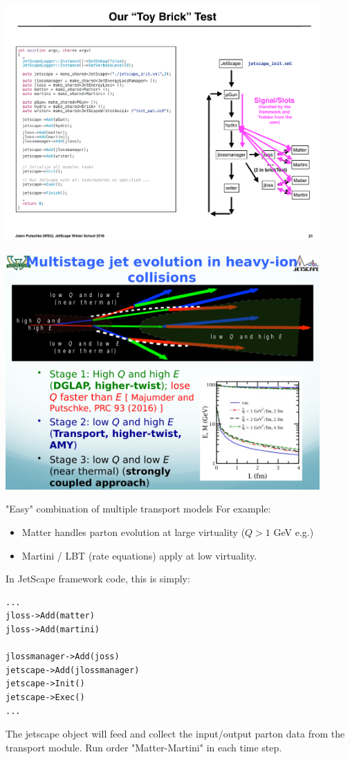 \documentclass[11pt]{beamer}
\begin{document}
\begin{frame}
\begin{center}
\includegraphics[width=0.9\textwidth]{./talks/p39.pdf}
\end{center}
\end{frame}

\begin{frame}
\begin{center}
\includegraphics[width=0.9\textwidth]{./talks/s25.pdf}
\end{center}
\end{frame}

\begin{frame}[fragile]{"Easy" combination of multiple transport models}
For example:
\begin{itemize}
\item Matter handles parton evolution at large virtuality ($Q > 1$ GeV e.g.)
\item Martini / LBT (rate equations) apply at low virtuality.
\end{itemize}
In JetScape framework code, this is simply:
\begin{lstlisting}
...
jloss->Add(matter)
jloss->Add(martini)

jlossmanager->Add(joss)
jetscape->Add(jlossmanager)
jetscape->Init()
jetscape->Exec()
...
\end{lstlisting}
The jetscape object will feed and collect the input/output parton data from the transport module. Run order "Matter-Martini" in each time step.

\end{frame}
\end{document}
